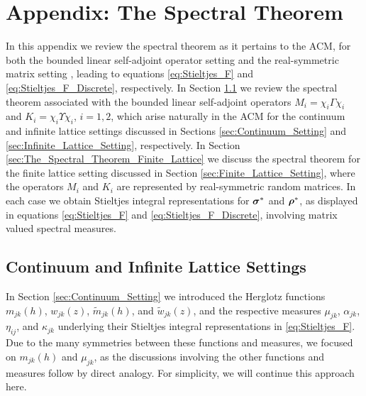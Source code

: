 \documentclass{cmslatex}
\newcommand\bsig{\mbox{\boldmath${\sigma}$}}
\newcommand\brho{\mbox{\boldmath${\rho}$}}
\begin{document}
\section{Appendix: The Spectral Theorem} 
\label{sec:The_Spectral_Theorem}
%
In this appendix we review the spectral theorem as it pertains to the
ACM, for both the bounded linear self-adjoint operator setting
\cite{Reed-1980,Stone:64} and the real-symmetric matrix setting
\cite{Kreyszig:JWS-1989,Halmos-1958,Stakgold:BVP:2000}, leading to equations
\eqref{eq:Stieltjes_F} and \eqref{eq:Stieltjes_F_Discrete}, 
respectively. In Section \ref{sec:The_Spectral_Theorem_Continuum} we
review the spectral theorem associated with the bounded linear
self-adjoint operators $M_i=\chi_i\Gamma\chi_i$ and $K_i=\chi_i\Upsilon\chi_i$, $i=1,2$, which
arise naturally in the ACM for the continuum and infinite lattice
settings discussed in Sections \ref{sec:Continuum_Setting} and
\ref{sec:Infinite_Lattice_Setting}, respectively.  In Section 
\ref{sec:The_Spectral_Theorem_Finite_Lattice} we discuss the spectral 
theorem for the finite lattice setting discussed in Section
\ref{sec:Finite_Lattice_Setting}, where the operators $M_i$ and $K_i$
are represented by real-symmetric random matrices. In each case we
obtain Stieltjes integral representations for $\bsig^*$ and $\brho^*$,
as displayed in equations \eqref{eq:Stieltjes_F} and
\eqref{eq:Stieltjes_F_Discrete}, involving matrix valued spectral
measures. 
%
\subsection{Continuum  and Infinite Lattice Settings}
\label{sec:The_Spectral_Theorem_Continuum} 
%
In Section \ref{sec:Continuum_Setting} we introduced the Herglotz 
functions $m_{jk}(h)$, $w_{jk}(z)$, $\tilde{m}_{jk}(h)$, and
$\tilde{w}_{jk}(z)$, and the respective measures $\mu_{jk}$, $\alpha_{jk}$,
$\eta_{ij}$, and $\kappa_{jk}$ underlying their Stieltjes integral
representations in \eqref{eq:Stieltjes_F}. Due to the many symmetries
between these functions and measures, we focused on $m_{jk}(h)$ and
$\mu_{jk}$, as the discussions involving the other functions and
measures follow by direct analogy. For simplicity, we will continue
this approach here.  
\end{document}
